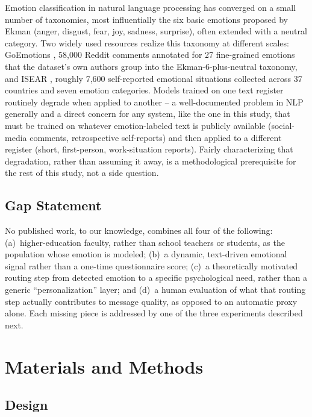 \documentclass[higheredu,article,submit,pdftex,moreauthors]{Definitions/mdpi}
\begin{document}
Emotion classification in natural language processing has converged on a small number of taxonomies, most influentially the six basic emotions proposed by Ekman \cite{ekman1992} (anger, disgust, fear, joy, sadness, surprise), often extended with a neutral category. Two widely used resources realize this taxonomy at different scales: GoEmotions \cite{demszky2020}, 58{,}000 Reddit comments annotated for 27 fine-grained emotions that the dataset's own authors group into the Ekman-6-plus-neutral taxonomy, and ISEAR \cite{scherer1994}, roughly 7{,}600 self-reported emotional situations collected across 37 countries and seven emotion categories. Models trained on one text register routinely degrade when applied to another -- a well-documented problem in NLP generally \cite{ramponi2020} and a direct concern for any system, like the one in this study, that must be trained on whatever emotion-labeled text is publicly available (social-media comments, retrospective self-reports) and then applied to a different register (short, first-person, work-situation reports). Fairly characterizing that degradation, rather than assuming it away, is a methodological prerequisite for the rest of this study, not a side question.

\subsection{Gap Statement}

No published work, to our knowledge, combines all four of the following: (a)~higher-education faculty, rather than school teachers or students, as the population whose emotion is modeled; (b)~a dynamic, text-driven emotional signal rather than a one-time questionnaire score; (c)~a theoretically motivated routing step from detected emotion to a specific psychological need, rather than a generic ``personalization'' layer; and (d)~a human evaluation of what that routing step actually contributes to message quality, as opposed to an automatic proxy alone. Each missing piece is addressed by one of the three experiments described next.

\section{Materials and Methods}

\subsection{Design}
\end{document}
